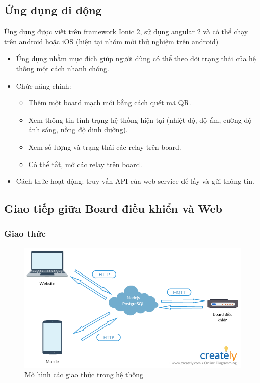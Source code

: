\documentclass[a4paper,12pt,oneside]{article}
\begin{document}
\subsection{Ứng dụng di động}
\noindent Ứng dụng được viết trên framework Ionic 2, sử dụng angular 2 và có thể chạy trên android hoặc iOS (hiện tại nhóm mới thử nghiệm trên android) 
\begin{itemize}
\item Ứng dụng nhằm mục đích giúp người dùng có thể theo dõi trạng thái của hệ thống một cách nhanh chóng.
\item Chức năng chính:
\begin{itemize}
\item Thêm một board mạch mới bằng cách quét mã QR. 
\item Xem thông tin tình trạng hệ thống hiện tại (nhiệt độ, độ ẩm, cường độ ánh sáng, nồng độ dinh dưỡng).
\item Xem số lượng và trạng thái các relay trên board. 
\item Có thể tắt, mở các relay trên board.
\end{itemize}
\item Cách thức hoạt động: truy vấn API của web service để lấy và gửi thông tin.
\end{itemize}



\subsection{Giao tiếp giữa Board điều khiển và Web}
\subsubsection{Giao thức}

\begin{center}
\begin{figure}[htp]
\begin{center}
\includegraphics[scale=.5]{hinh/system-protocol.png}
\end{center}
\caption{Mô hình các giao thức trong hệ thống}
\label{refhinh1}
\end{figure}
\end{center}
\end{document}
